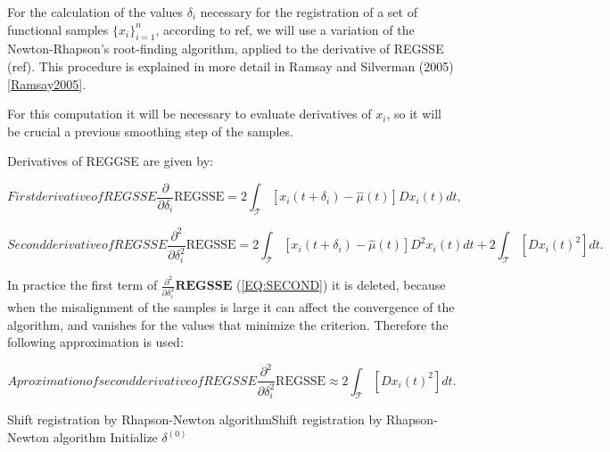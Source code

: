 

For the calculation of the values $\delta_i$ necessary for the registration of a
set of functional samples $\{x_i\}_{i=1}^{n}$, according to ref{},
we will use a variation of the Newton-Rhapson's root-finding algorithm, applied
to the derivative of REGSSE (ref{}). This procedure is explained in more detail
in Ramsay and Silverman (2005) \ref{Ramsay2005}.

For this computation it will be necessary to evaluate derivatives of
$x_i$, so it will be crucial a previous smoothing step of the samples.

Derivatives of REGGSE are given by:

\begin{equation}[EQ:FIRST]{First derivative of REGSSE}
\frac{\partial}{\partial \delta_i} \text{REGSSE} = 2 \int_{\mathcal{T}}
\left [ x_i(t + \delta_i) - \hat \mu(t) \right ] Dx_i(t) dt,
\end{equation}

\begin{equation}[EQ:SECOND]{Second derivative of REGSSE}
\frac{\partial^2}{\partial \delta^2_i} \text{REGSSE} = 2
\int_{\mathcal{T}} \left [ x_i(t + \delta_i) - \hat \mu(t) \right ]
D^2x_i(t) dt + 2 \int_{\mathcal{T}} \left [  Dx_i(t)^2 \right ]  dt.
\end{equation}

In practice the first term of $\frac{\partial^2}{\partial \delta^2_i}\textbf{REGSSE}$
(\ref{EQ:SECOND}) it is deleted, because when the misalignment of the samples is large it
can affect the convergence of the algorithm, and vanishes for the values that
minimize the criterion. Therefore the following approximation is used:

\begin{equation}[]{Aproximation of second derivative of REGSSE}
\frac{\partial^2}{\partial \delta^2_i} \text{REGSSE} \approx  
2 \int_{\mathcal{T}} \left [  Dx_i(t)^2 \right ]  dt.
\end{equation}

\begin{algorithmN}{Shift registration by Rhapson-Newton algorithm}{Shift registration by Rhapson-Newton algorithm}
	\BlankLine
	Initialize $\delta^{(0)}$ \;
	
\end{algorithmN}

